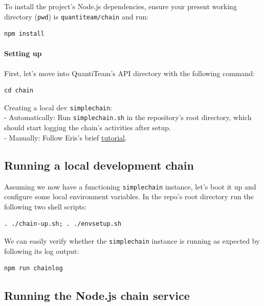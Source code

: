 \documentclass[12pt]{report}
\let\oldparagraph\paragraph
\renewcommand{\paragraph}[1]{\oldparagraph{#1}\mbox{}}
\begin{document}
To install the project's Node.js dependencies, ensure your present
working directory (\texttt{pwd}) is \texttt{quantiteam/chain} and run:

\begin{verbatim}
npm install
\end{verbatim}

\paragraph{Setting up}\label{setting-up}

First, let's move into QuantiTeam's API directory with the following
command:

\begin{verbatim}
cd chain
\end{verbatim}

Creating a local dev \texttt{simplechain}:\\
- Automatically: Run \texttt{simplechain.sh} in the repository's root
directory, which should start logging the chain's activities after
setup.\\
- Manually: Follow Eris's brief
\href{https://docs.erisindustries.com/tutorials/chain-making/}{tutorial}.

\subsection{Running a local development
chain}\label{running-a-local-development-chain}

Assuming we now have a functioning \texttt{simplechain} instance, let's
boot it up and configure some local environment variables. In the repo's
root directory run the following two shell scripts:

\begin{verbatim}
. ./chain-up.sh; . ./envsetup.sh
\end{verbatim}

We can easily verify whether the \texttt{simplechain} instance is
running as expected by following its log output:

\begin{verbatim}
npm run chainlog
\end{verbatim}

\subsection{Running the Node.js chain
service}\label{running-the-node.js-chain-service}
\end{document}
